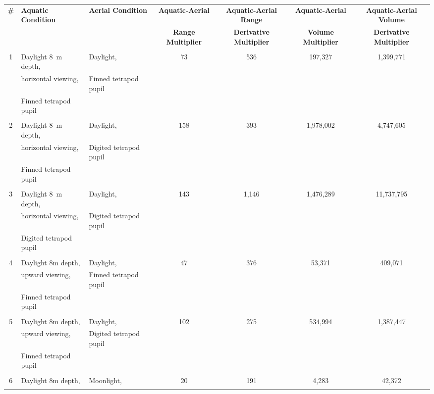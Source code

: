\begin{tabular}{cllcccc}
\toprule
\multirow{2}{*}{\textbf{\#}}&\multirow{2}{*}{\textbf{Aquatic Condition}}&\multirow{2}{*}{\textbf{Aerial Condition}}&\textbf{Aquatic-Aerial}&\textbf{Aquatic-Aerial Range }&\textbf{Aquatic-Aerial}&\textbf{Aquatic-Aerial Volume}\\\
&&&\textbf{Range Multiplier}&\textbf{Derivative Multiplier}&\textbf{Volume Multiplier}&\textbf{Derivative Multiplier}\\\\\hline
\multirow{3}{*}{1}&Daylight 8~m depth,&Daylight,&\multirow{3}{*}{73}&\multirow{3}{*}{536}&\multirow{3}{*}{197,327}&\multirow{3}{*}{1,399,771}\\\
&horizontal viewing,&Finned tetrapod pupil&&&&\\\
&Finned tetrapod pupil&&&&&\\\\\hline
\multirow{3}{*}{2}&Daylight 8~m depth,&Daylight,&\multirow{3}{*}{158}&\multirow{3}{*}{393}&\multirow{3}{*}{1,978,002}&\multirow{3}{*}{4,747,605}\\\
&horizontal viewing,&Digited tetrapod pupil&&&&\\\
&Finned tetrapod pupil&&&&&\\\\\hline
\multirow{3}{*}{3}&Daylight 8~m depth,&Daylight,&\multirow{3}{*}{143}&\multirow{3}{*}{1,146}&\multirow{3}{*}{1,476,289}&\multirow{3}{*}{11,737,795}\\\
&horizontal viewing,&Digited tetrapod pupil&&&&\\\
&Digited tetrapod pupil&&&&&\\\\\hline
\multirow{3}{*}{4}&Daylight 8m depth,&Daylight,&\multirow{3}{*}{47}&\multirow{3}{*}{376}&\multirow{3}{*}{53,371}&\multirow{3}{*}{409,071}\\\
&upward viewing,&Finned tetrapod pupil&&&&\\\
&Finned tetrapod pupil&&&&&\\\\\hline
\multirow{3}{*}{5}&Daylight 8m depth,&Daylight,&\multirow{3}{*}{102}&\multirow{3}{*}{275}&\multirow{3}{*}{534,994}&\multirow{3}{*}{1,387,447}\\\
&upward viewing,&Digited tetrapod pupil&&&&\\\
&Finned tetrapod pupil&&&&&\\\\\hline
\multirow{3}{*}{6}&Daylight 8m depth,&Moonlight,&\multirow{3}{*}{20}&\multirow{3}{*}{191}&\multirow{3}{*}{4,283}&\multirow{3}{*}{42,372}\\\

\end{tabular}
